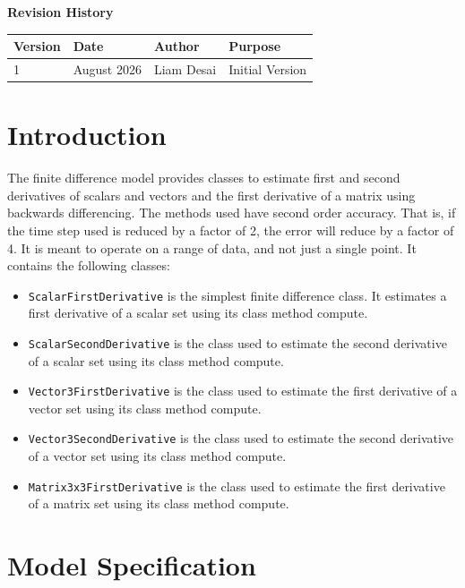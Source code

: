 \documentclass{report}
\begin{document}
\titlePage
\thispagestyle{empty}
\tableofcontents %
\vfill
{\Large \textbf {Revision History}}
{\large
\begin{center}
\begin{tabular}{|l||l|l|l|}
\hline
 \textbf{Version} & \textbf{Date} & \textbf{Author} & \textbf{Purpose} \\ \hline \hline
1 & August 2026 & Liam Desai & Initial Version \\ \hline
\end{tabular}
\end{center}
}

\chapter{Introduction} %
\par The finite difference model provides classes to estimate first and second derivatives of scalars and vectors and the first derivative of a matrix using backwards differencing. 
The methods used have second order accuracy. That is, if the time step used is reduced by a factor of 2, the error will reduce by a factor of 4. It is meant to operate on a range of data, and not just a single point.
It contains the following classes: \begin{itemize}
    \item \verb|ScalarFirstDerivative| is the simplest finite difference class. It estimates a first derivative of a scalar set using its class method compute.
    \item \verb|ScalarSecondDerivative| is the class used to estimate the second derivative of a scalar set using its class method compute.
    \item \verb|Vector3FirstDerivative| is the class used to estimate the first derivative of a vector set using its class method compute.
    \item \verb|Vector3SecondDerivative| is the class used to estimate the second derivative of a vector set using its class method compute.
    \item \verb|Matrix3x3FirstDerivative| is the class used to estimate the first derivative of a matrix set using its class method compute.
\end{itemize}

\chapter{Model Specification}
\end{document}
